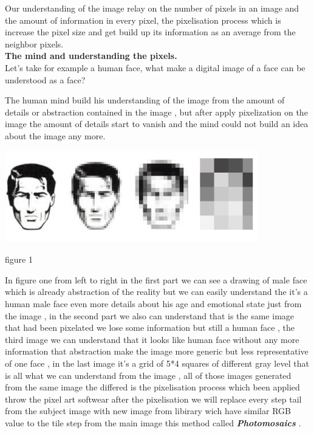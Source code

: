 \documentclass[a4paper,12pt]{report}
\begin{document}
	Our understanding of the image relay on the number of pixels in an image and the amount of information in every pixel, the pixelisation process which is increase the pixel size and get build up its information as an average from the neighbor pixels.\\
	
	
	
	\textbf{ The mind and understanding the pixels.}\\
	
	Let’s take for example a human face, what make a digital image of a face can be understood as a face?
	
	The human mind build his understanding of the image from the amount of details or abstraction contained in the image , but after apply pixelization on the image the amount of details start to vanish and the mind could not build an idea about the image any more.\\
	
	
	

	\begin{center}
		\includegraphics[width=11cm, height=4cm,
		keepaspectratio]{pix.jpg}
		
		{figure 1}
		\\
	\end{center}
  
	
	In figure one from left to right in the first part 
	we can see a drawing of  male face which is already abstraction of the reality but we can easily understand the it’s a human male face even more details about his age and emotional state just from the image , in the second part we also can understand that is the same image that had been pixelated we lose some information but still a human face , the third image we can understand that it looks like  human face without any more information that abstraction make the image more generic but less representative of one face  , in the last image it’s a grid of 5*4 squares of different gray level that is all what we can understand from the image , all of those images generated from the same image the differed is the pixelisation process which been applied throw the pixel art softwear after the pixelisation we will replace every step tail from the subject image with new image from libirary wich have similar RGB value to the tile step from the main image this method called \textbf{\emph{Photomosaics}} .\\
	
\end{document}
